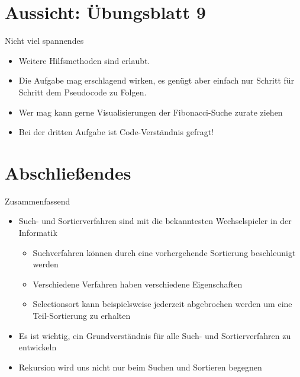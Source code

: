 \iffull
{}
\section{Aussicht: Übungsblatt 9}
\begin{frame}{Nicht viel spannendes}
    \begin{itemize}[<+(1)->]
        \itemsep5pt
        \item Weitere Hilfsmethoden sind erlaubt.
        \item Die Aufgabe mag erschlagend wirken, es genügt aber einfach nur Schritt für Schritt dem Pseudocode zu Folgen.
        \item Wer mag kann gerne Visualisierungen der Fibonacci-Suche zurate ziehen 
        \item Bei der dritten Aufgabe ist Code-Verständnis gefragt!
    \end{itemize}
\end{frame}

\fi

\section{Abschließendes}
{\SummaryFrame
\begin{frame}[t]{Zusammenfassend}
\pause \printBibCommand
\vfill\vfill %
\begin{itemize}[<+(1)->]
    \itemsep4pt
    \item Such- und Sortierverfahren sind mit die bekanntesten Wechselspieler in der Informatik
    \begin{itemize}
        \item Suchverfahren können durch eine vorhergehende Sortierung beschleunigt werden
        \item Verschiedene Verfahren haben verschiedene Eigenschaften
        \item Selectionsort kann beispielsweise jederzeit abgebrochen werden um eine Teil-Sortierung zu erhalten
    \end{itemize}
    \item Es ist wichtig, ein Grundverständnis für alle Such- und Sortierverfahren zu entwickeln
    \item Rekursion wird uns nicht nur beim Suchen und Sortieren begegnen
\end{itemize}
\end{frame}
}

